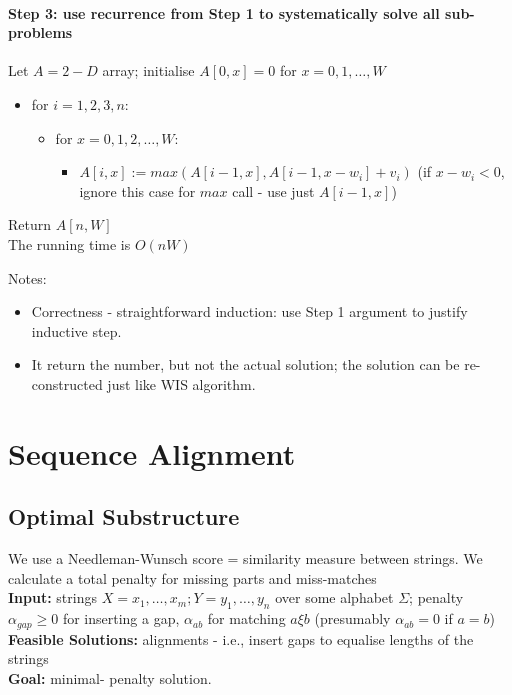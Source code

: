 \documentclass{scrartcl}
\begin{document}
\paragraph{Step 3: use recurrence from Step 1 to systematically solve all sub-problems}
Let $A = 2-D$ array; initialise $A[0, x] = 0$ for $x=0, 1, \dots, W$
\begin{itemize}
\item for $i = 1, 2, 3 \dot, n$:
  \begin{itemize}
  \item for $x = 0, 1, 2, \dots, W$:
    \begin{itemize}
    \item $A[i, x] := max(A[i-1, x], A[i-1, x-w_i] + v_i)$ (if $x-w_i < 0$,
      ignore this case for $max$ call - use just $A[i-1, x]$)
    \end{itemize}
  \end{itemize}
\end{itemize}
Return $A[n, W]$\\
The running time is $O(nW)$

Notes:
\begin{itemize}
\item Correctness - straightforward induction: use Step 1 argument to justify
  inductive step.
\item It return the number, but not the actual solution; the solution can be
  re-constructed just like WIS algorithm.
\end{itemize}

\section{Sequence Alignment}
\label{sec:11-1}
\subsection{Optimal Substructure}
\label{sec:11-1-1}
We use a Needleman-Wunsch score = similarity measure between strings. We
calculate a total penalty for missing parts and miss-matches\\
{\bf Input: } strings $X = x_1, \dots, x_m; Y = y_1, \dots, y_n$ over some alphabet $\Sigma$; penalty $\alpha_{gap} \geq 0$ for inserting a gap, 
$\alpha_{ab}$ for matching $a \xi b$ (presumably $\alpha_{ab} = 0$ if $a=b$)\\
{\bf Feasible Solutions: } alignments - i.e., insert gaps to equalise lengths of the strings\\
{\bf Goal: } minimal- penalty solution.\\
\end{document}
